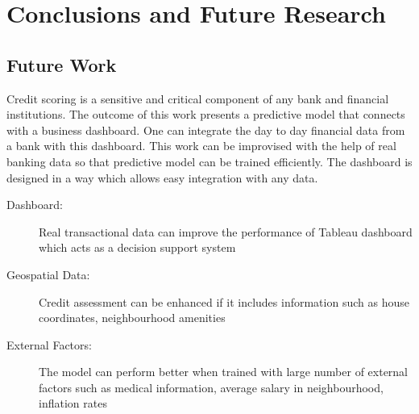 %
%
%
%

\chapter{Conclusions and Future Research}\label{C.Conclusions.Future.research}

\section{Future Work}

Credit scoring is a sensitive and critical component of any bank and financial institutions. The outcome of this work presents a predictive model that connects with a business dashboard. One can integrate the day to day financial data from a bank with this dashboard. This work can be improvised with the help of real banking data so that predictive model can be trained efficiently. The dashboard is designed in a way which allows easy integration with any data. 
\begin{description}
\item[Dashboard:] Real transactional data can improve the performance of Tableau dashboard which acts as a decision support system 
\item[Geospatial Data:] Credit assessment can be enhanced if it includes information such as house coordinates, neighbourhood amenities 
\item[External Factors:] The model can perform better when trained with large number of external factors such as medical information, average salary in neighbourhood, inflation rates

\end{description}

